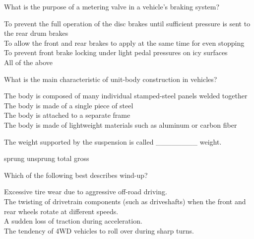 \documentclass[12pt]{exam}
\begin{document}
\begin{questions}
				\question What is the purpose of a metering valve in a vehicle’s braking system? \\
				\begin{oneparchoices} 
					\choice To prevent the full operation of the disc brakes until sufficient pressure is sent to the rear drum brakes \\
					\choice To allow the front and rear brakes to apply at the same time for even stopping \\
					\choice To prevent front brake locking under light pedal pressures on icy surfaces \\
					\choice All of the above 
				\end{oneparchoices}
			
				
			
				\question What is the main characteristic of unit-body construction in vehicles? \\
				\begin{oneparchoices} 
					\choice The body is composed of many individual stamped-steel panels welded together \\
					\choice The body is made of a single piece of steel \\
					\choice The body is attached to a separate frame \\
					\choice The body is made of lightweight materials such as aluminum or carbon fiber 
				\end{oneparchoices}

                 \question The weight supported by the suspension is called \_\_\_\_\_\_\_\_ weight. \\
                \begin{oneparchoices} 
                    \choice sprung
                    \choice unsprung
                    \choice total
                    \choice gross
                \end{oneparchoices}

                \question  Which of the following best describes wind-up? \\
                \begin{oneparchoices}
                    \choice Excessive tire wear due to aggressive off-road driving.\\
                    \choice The twisting of drivetrain components (such as driveshafts) when the front and rear wheels rotate at different speeds.\\
                    \choice A sudden loss of traction during acceleration.\\
                    \choice The tendency of 4WD vehicles to roll over during sharp turns.
                \end{oneparchoices}
                                

\end{questions}
\end{document}

